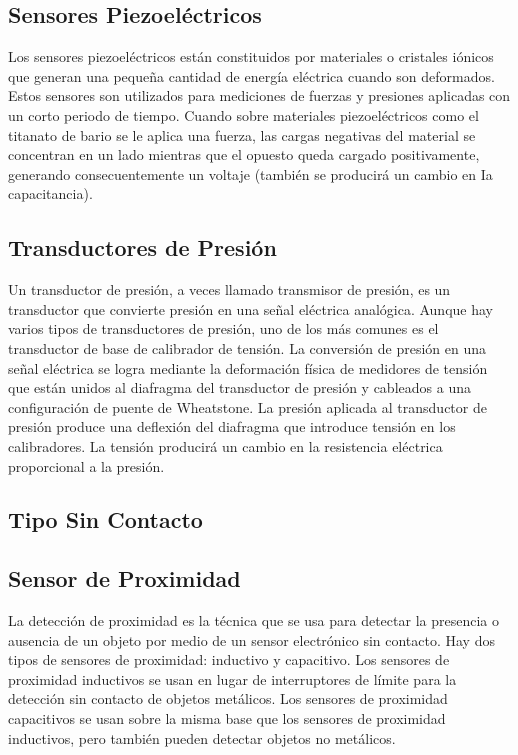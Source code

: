 \subsection*{\quad\textbf{Sensores Piezoeléctricos}}
Los sensores piezoeléctricos están constituidos por materiales o cristales iónicos que generan una pequeña cantidad de energía eléctrica cuando son deformados. Estos sensores son utilizados para mediciones de fuerzas y presiones aplicadas con un corto periodo de tiempo.
Cuando sobre materiales piezoeléctricos como el titanato de bario se le aplica una fuerza, las cargas negativas del material se concentran en un lado mientras que el opuesto queda cargado positivamente, generando consecuentemente un voltaje (también se producirá un cambio en Ia capacitancia).
\cite{Torres2000}

\subsection*{\quad\textbf{Transductores de Presión}}
Un transductor de presión, a veces llamado transmisor de presión, es un transductor que convierte presión en una señal eléctrica analógica. Aunque hay varios tipos de transductores de presión, uno de los más comunes es el transductor de base de calibrador de tensión. La conversión de presión en una señal eléctrica se logra mediante la deformación física de medidores de tensión que están unidos al diafragma del transductor de presión y cableados a una configuración de puente de Wheatstone. La presión aplicada al transductor de presión produce una deflexión del diafragma que introduce tensión en los calibradores. La tensión producirá un cambio en la resistencia eléctrica proporcional a la presión. \cite{OmegaPressureTransducers}

\subsection{Tipo Sin Contacto}

\subsection*{\quad\textbf{Sensor de Proximidad}}
La detección de proximidad es la técnica que se usa para detectar la presencia o ausencia de un objeto por medio de un sensor electrónico sin contacto. Hay dos tipos de sensores de proximidad: inductivo y capacitivo. Los sensores de proximidad inductivos se usan en lugar de interruptores de límite para la detección sin contacto de objetos metálicos. Los sensores de proximidad capacitivos se usan sobre la misma base que los sensores de proximidad inductivos, pero también pueden detectar objetos no metálicos.



\pagebreak
